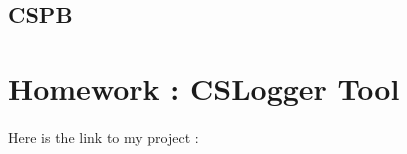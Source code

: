\documentclass[14pt]
{article}
\begin{document}
\pagestyle{fancy}

\bigskip
\begin{center}
	\section*{\textbf{{\LARGE CSPB}}}
\end{center}
\bigskip\bigskip\bigskip

\section*{Homework : CSLogger Tool }
\paragraph*{} Here is the link to my project : \href{}{}
\end{document}

